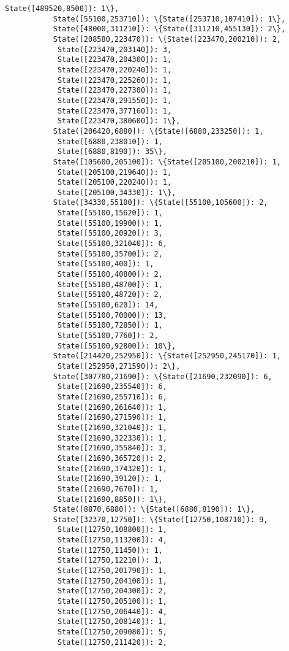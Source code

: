 \documentclass[11pt]{article}
\begin{document}
\begin{Verbatim}[commandchars=\\\{\}]
            State([489520,8500]): 1\},
           State([55100,253710]): \{State([253710,107410]): 1\},
           State([48000,311210]): \{State([311210,455130]): 2\},
           State([208580,223470]): \{State([223470,200210]): 2,
            State([223470,203140]): 3,
            State([223470,204300]): 1,
            State([223470,220240]): 1,
            State([223470,225260]): 1,
            State([223470,227300]): 1,
            State([223470,291550]): 1,
            State([223470,377160]): 1,
            State([223470,380600]): 1\},
           State([206420,6880]): \{State([6880,233250]): 1,
            State([6880,238010]): 1,
            State([6880,8190]): 35\},
           State([105600,205100]): \{State([205100,200210]): 1,
            State([205100,219640]): 1,
            State([205100,220240]): 1,
            State([205100,34330]): 1\},
           State([34330,55100]): \{State([55100,105600]): 2,
            State([55100,15620]): 1,
            State([55100,19900]): 1,
            State([55100,20920]): 3,
            State([55100,321040]): 6,
            State([55100,35700]): 2,
            State([55100,400]): 1,
            State([55100,40800]): 2,
            State([55100,48700]): 1,
            State([55100,48720]): 2,
            State([55100,620]): 14,
            State([55100,70000]): 13,
            State([55100,72850]): 1,
            State([55100,7760]): 2,
            State([55100,92800]): 10\},
           State([214420,252950]): \{State([252950,245170]): 1,
            State([252950,271590]): 2\},
           State([307780,21690]): \{State([21690,232090]): 6,
            State([21690,235540]): 6,
            State([21690,255710]): 6,
            State([21690,261640]): 1,
            State([21690,271590]): 1,
            State([21690,321040]): 1,
            State([21690,322330]): 1,
            State([21690,355840]): 3,
            State([21690,365720]): 2,
            State([21690,374320]): 1,
            State([21690,39120]): 1,
            State([21690,7670]): 1,
            State([21690,8850]): 1\},
           State([8870,6880]): \{State([6880,8190]): 1\},
           State([32370,12750]): \{State([12750,108710]): 9,
            State([12750,108800]): 1,
            State([12750,113200]): 4,
            State([12750,11450]): 1,
            State([12750,12210]): 1,
            State([12750,201790]): 1,
            State([12750,204100]): 1,
            State([12750,204300]): 2,
            State([12750,205100]): 1,
            State([12750,206440]): 4,
            State([12750,208140]): 1,
            State([12750,209080]): 5,
            State([12750,211420]): 2,

\end{Verbatim}
\end{document}
